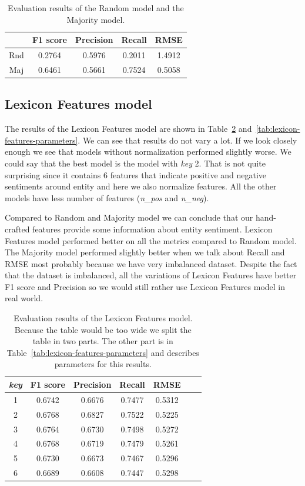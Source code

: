 \documentclass[11pt,a4paper]{article}
\begin{document}
\begin{table}[h]
\centering
\begin{tabular}{ccccc}
    & F1 score & Precision & Recall & RMSE   \\ \hline
Rnd & 0.2764   & 0.5976    & 0.2011 & 1.4912 \\
Maj & 0.6461   & 0.5661    & 0.7524 & 0.5058
\end{tabular}
\caption{Evaluation results of the Random model and the Majority model.}
\label{tab:rnd-maj-results}
\end{table}

\subsection{Lexicon Features model}

The results of the Lexicon Features model are shown in Table~\ref{tab:lexicon-features-results} and~\ref{tab:lexicon-features-parameters}.
We can see that results do not vary a lot. 
If we look closely enough we see that models without normalization performed slightly worse.
We could say that the best model is the model with \emph{key} 2. 
That is not quite surprising since it contains 6 features that indicate positive and negative sentiments around entity and here we also normalize features.
All the other models have less number of features (\emph{n\_pos} and \emph{n\_neg}). 

Compared to Random and Majority model we can conclude that our hand-crafted features provide some information about entity sentiment.
Lexicon Features model performed better on all the metrics compared to Random model.
The Majority model performed slightly better when we talk about Recall and RMSE most probably because we have very imbalanced dataset.
Despite the fact that the dataset is imbalanced, all the variations of Lexicon Features have better F1 score and Precision so we would still rather use Lexicon Features model in real world.


\begin{table}[h]
\centering
\begin{tabular}{ccccccc}
\emph{key} & F1 score & Precision & Recall & RMSE   \\ \hline
1 & 0.6742   & 0.6676    & 0.7477 & 0.5312 \\
2 & 0.6768   & 0.6827    & 0.7522 & 0.5225 \\
3 & 0.6764   & 0.6730    & 0.7498 & 0.5272 \\
4 & 0.6768   & 0.6719    & 0.7479 & 0.5261 \\
5 & 0.6730   & 0.6673    & 0.7467 & 0.5296 \\
6 & 0.6689   & 0.6608    & 0.7447 & 0.5298 \\
\end{tabular}
\caption{Evaluation results of the Lexicon Features model. Because the table would be too wide we split the table in two parts. The other part is in Table~\ref{tab:lexicon-features-parameters} and describes parameters for this results. }
\label{tab:lexicon-features-results}
\end{table}
\end{document}
